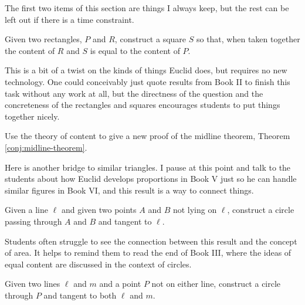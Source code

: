 \begin{annotation}
{
\color{blue}
The first two items of this section are things I always keep, but the rest can be left out if there is a time constraint.
}
\end{annotation}

\begin{problem}\label{prob:subtract-rect}
Given two rectangles, $P$ and $R$, construct a square $S$ so that, when taken together the content of $R$ and $S$ is equal to the content of $P$.
\end{problem}

\begin{annotation}
{
\color{blue}
This is a bit of a twist on the kinds of things Euclid does, but requires no new technology. One could conceivably just quote results from Book II to finish this task without any work at all, but the directness of the question and the concreteness of the rectangles and squares encourages students to put things together nicely.
}
\end{annotation}


\begin{problem} \label{conj:parallel-in-triangle} Use the theory of content to give a new proof of the midline theorem, Theorem \ref{conj:midline-theorem}.
\end{problem}

\begin{annotation}
{
\color{blue}
Here is another bridge to similar triangles. I pause at this point and talk to the students about how Euclid develops proportions in Book V just so he can handle similar figures in Book VI, and this result is a way to connect things.
}
\end{annotation}

\begin{challenge}\label{chal:circle-given-two-points-tangent}
Given a line $\ell$ and given two points $A$ and $B$ not lying on $\ell$, construct a circle passing through $A$ and $B$ and tangent to $\ell$.
\end{challenge}

\begin{annotation}
{
\color{blue}
Students often struggle to see the connection between this result and the concept of area. It helps to remind them to read the end of Book III, where the ideas of equal content are discussed in the context of circles.
}
\end{annotation}

\begin{challenge}\label{chal:circle-point-two-tangents}
Given two lines $\ell$ and $m$ and a point $P$ not on either line, construct a circle through $P$ and tangent to both $\ell$ and $m$.
\end{challenge}


